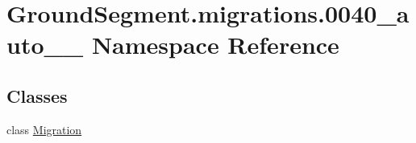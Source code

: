 \hypertarget{namespace_ground_segment_1_1migrations_1_10040__auto__20170131__2025}{}\section{Ground\+Segment.\+migrations.0040\+\_\+auto\+\_\+\_ Namespace Reference}
\label{namespace_ground_segment_1_1migrations_1_10040__auto__20170131__2025}
\subsection*{Classes}
\begin{DoxyCompactItemize}
\item 
class \hyperlink{class_ground_segment_1_1migrations_1_10040__auto__20170131__2025_1_1_migration}{Migration}
\end{DoxyCompactItemize}
